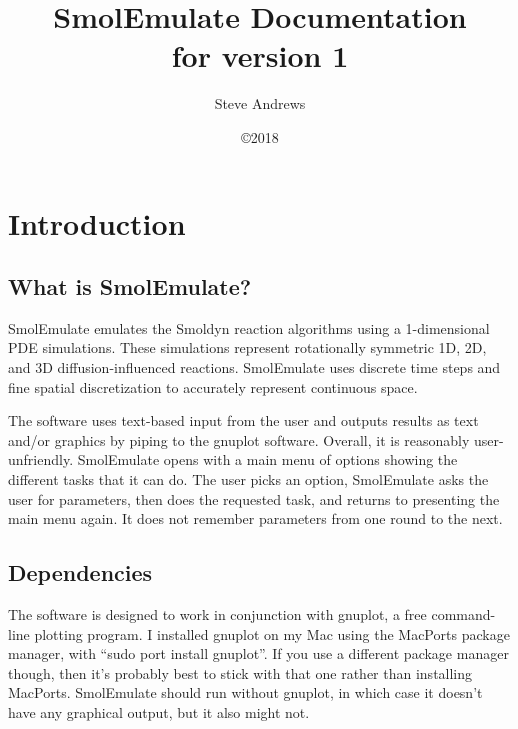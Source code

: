 \documentclass {book}
\begin{document}



\title{\textbf{SmolEmulate Documentation} \\ \large for version 1}
\date{\copyright 2018}
\author{Steve Andrews}
\maketitle

\tableofcontents


\chapter{Introduction}

\section{What is SmolEmulate?}

SmolEmulate emulates the Smoldyn reaction algorithms using a 1-dimensional PDE simulations. These simulations represent rotationally symmetric 1D, 2D, and 3D diffusion-influenced reactions. SmolEmulate uses discrete time steps and fine spatial discretization to accurately represent continuous space.

The software uses text-based input from the user and outputs results as text and/or graphics by piping to the gnuplot software. Overall, it is reasonably user-unfriendly. SmolEmulate opens with a main menu of options showing the different tasks that it can do. The user picks an option, SmolEmulate asks the user for parameters, then does the requested task, and returns to presenting the main menu again. It does not remember parameters from one round to the next.

\section{Dependencies}

The software is designed to work in conjunction with gnuplot, a free command-line plotting program. I installed gnuplot on my Mac using the MacPorts package manager, with ``sudo port install gnuplot''. If you use a different package manager though, then it's probably best to stick with that one rather than installing MacPorts. SmolEmulate should run without gnuplot, in which case it doesn't have any graphical output, but it also might not.
\end{document}
